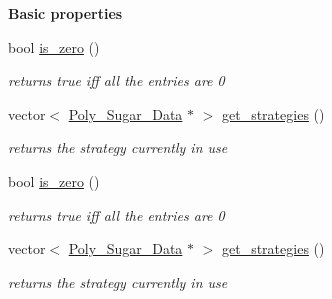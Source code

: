 \begin{Indent}\textbf{ Basic properties}\par
\begin{DoxyCompactItemize}
\item 
\mbox{\label{group___g_b_computation_aee8c1358071a26e60b2e50f9678dcfb0}} 
bool \hyperlink{group___g_b_computation_aee8c1358071a26e60b2e50f9678dcfb0}{is\+\_\+zero} ()
\begin{DoxyCompactList}\small\item\em returns {\ttfamily true} iff all the entries are 0 \end{DoxyCompactList}\item 
\mbox{\label{group___g_b_computation_a1e58764d1bee3437e2bfa74fbb847b1a}} 
vector$<$ \hyperlink{group__strategygroup_class_poly___sugar___data}{Poly\+\_\+\+Sugar\+\_\+\+Data} $\ast$ $>$ \hyperlink{group___g_b_computation_a1e58764d1bee3437e2bfa74fbb847b1a}{get\+\_\+strategies} ()
\begin{DoxyCompactList}\small\item\em returns the strategy currently in use \end{DoxyCompactList}\item 
\mbox{\label{group___g_b_computation_aee8c1358071a26e60b2e50f9678dcfb0}} 
bool \hyperlink{group___g_b_computation_aee8c1358071a26e60b2e50f9678dcfb0}{is\+\_\+zero} ()
\begin{DoxyCompactList}\small\item\em returns {\ttfamily true} iff all the entries are 0 \end{DoxyCompactList}\item 
\mbox{\label{group___g_b_computation_a1e58764d1bee3437e2bfa74fbb847b1a}} 
vector$<$ \hyperlink{group__strategygroup_class_poly___sugar___data}{Poly\+\_\+\+Sugar\+\_\+\+Data} $\ast$ $>$ \hyperlink{group___g_b_computation_a1e58764d1bee3437e2bfa74fbb847b1a}{get\+\_\+strategies} ()
\begin{DoxyCompactList}\small\item\em returns the strategy currently in use \end{DoxyCompactList}\end{DoxyCompactItemize}
\end{Indent}
